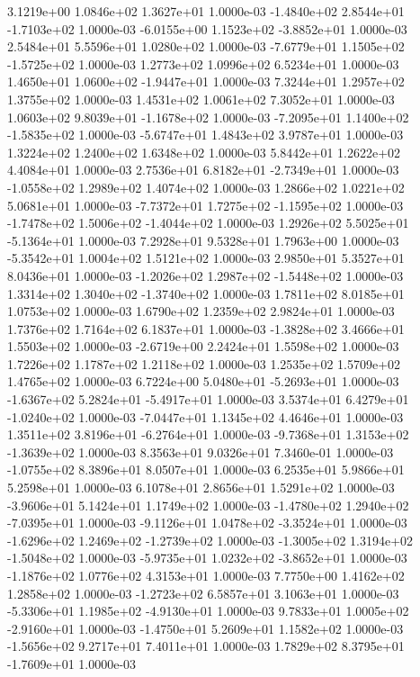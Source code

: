 3.1219e+00 1.0846e+02 1.3627e+01  1.0000e-03
-1.4840e+02  2.8544e+01 -1.7103e+02  1.0000e-03
-6.0155e+00  1.1523e+02 -3.8852e+01  1.0000e-03
2.5484e+01 5.5596e+01 1.0280e+02  1.0000e-03
-7.6779e+01  1.1505e+02 -1.5725e+02  1.0000e-03
1.2773e+02 1.0996e+02 6.5234e+01  1.0000e-03
 1.4650e+01  1.0600e+02 -1.9447e+01  1.0000e-03
7.3244e+01 1.2957e+02 1.3755e+02  1.0000e-03
1.4531e+02 1.0061e+02 7.3052e+01  1.0000e-03
 1.0603e+02  9.8039e+01 -1.1678e+02  1.0000e-03
-7.2095e+01  1.1400e+02 -1.5835e+02  1.0000e-03
-5.6747e+01  1.4843e+02  3.9787e+01  1.0000e-03
1.3224e+02 1.2400e+02 1.6348e+02  1.0000e-03
5.8442e+01 1.2622e+02 4.4084e+01  1.0000e-03
 2.7536e+01  6.8182e+01 -2.7349e+01  1.0000e-03
-1.0558e+02  1.2989e+02  1.4074e+02  1.0000e-03
1.2866e+02 1.0221e+02 5.0681e+01  1.0000e-03
-7.7372e+01  1.7275e+02 -1.1595e+02  1.0000e-03
-1.7478e+02  1.5006e+02 -1.4044e+02  1.0000e-03
 1.2926e+02  5.5025e+01 -5.1364e+01  1.0000e-03
7.2928e+01 9.5328e+01 1.7963e+00  1.0000e-03
-5.3542e+01  1.0004e+02  1.5121e+02  1.0000e-03
2.9850e+01 5.3527e+01 8.0436e+01  1.0000e-03
-1.2026e+02  1.2987e+02 -1.5448e+02  1.0000e-03
 1.3314e+02  1.3040e+02 -1.3740e+02  1.0000e-03
1.7811e+02 8.0185e+01 1.0753e+02  1.0000e-03
1.6790e+02 1.2359e+02 2.9824e+01  1.0000e-03
1.7376e+02 1.7164e+02 6.1837e+01  1.0000e-03
-1.3828e+02  3.4666e+01  1.5503e+02  1.0000e-03
-2.6719e+00  2.2424e+01  1.5598e+02  1.0000e-03
1.7226e+02 1.1787e+02 1.2118e+02  1.0000e-03
1.2535e+02 1.5709e+02 1.4765e+02  1.0000e-03
 6.7224e+00  5.0480e+01 -5.2693e+01  1.0000e-03
-1.6367e+02  5.2824e+01 -5.4917e+01  1.0000e-03
 3.5374e+01  6.4279e+01 -1.0240e+02  1.0000e-03
-7.0447e+01  1.1345e+02  4.4646e+01  1.0000e-03
 1.3511e+02  3.8196e+01 -6.2764e+01  1.0000e-03
-9.7368e+01  1.3153e+02 -1.3639e+02  1.0000e-03
8.3563e+01 9.0326e+01 7.3460e-01  1.0000e-03
-1.0755e+02  8.3896e+01  8.0507e+01  1.0000e-03
6.2535e+01 5.9866e+01 5.2598e+01  1.0000e-03
6.1078e+01 2.8656e+01 1.5291e+02  1.0000e-03
-3.9606e+01  5.1424e+01  1.1749e+02  1.0000e-03
-1.4780e+02  1.2940e+02 -7.0395e+01  1.0000e-03
-9.1126e+01  1.0478e+02 -3.3524e+01  1.0000e-03
-1.6296e+02  1.2469e+02 -1.2739e+02  1.0000e-03
-1.3005e+02  1.3194e+02 -1.5048e+02  1.0000e-03
-5.9735e+01  1.0232e+02 -3.8652e+01  1.0000e-03
-1.1876e+02  1.0776e+02  4.3153e+01  1.0000e-03
7.7750e+00 1.4162e+02 1.2858e+02  1.0000e-03
-1.2723e+02  6.5857e+01  3.1063e+01  1.0000e-03
-5.3306e+01  1.1985e+02 -4.9130e+01  1.0000e-03
 9.7833e+01  1.0005e+02 -2.9160e+01  1.0000e-03
-1.4750e+01  5.2609e+01  1.1582e+02  1.0000e-03
-1.5656e+02  9.2717e+01  7.4011e+01  1.0000e-03
 1.7829e+02  8.3795e+01 -1.7609e+01  1.0000e-03
